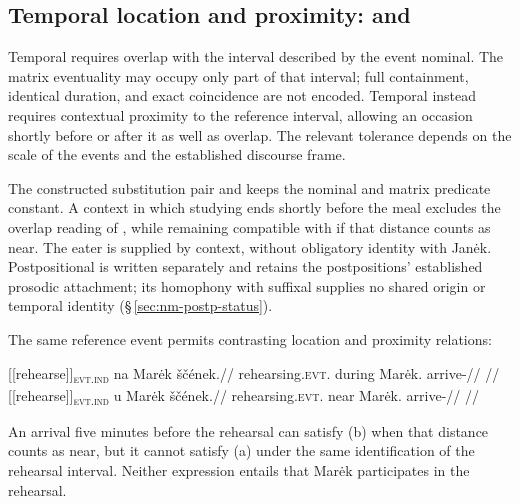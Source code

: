 \subsection{Temporal location and proximity:  and }

Temporal  requires overlap with the interval described by the event
nominal. The matrix eventuality may occupy only part of that interval; full
containment, identical duration, and exact coincidence are not encoded.
Temporal  instead requires contextual proximity to the reference
interval, allowing an occasion shortly before or after it as well as overlap.
The relevant tolerance depends on the scale of the events and the established
discourse frame.

The constructed substitution pair 
 and
 keeps the nominal and
matrix predicate constant. A context in which studying ends shortly before
the meal excludes the overlap reading of , while remaining compatible
with  if that distance counts as near. The eater is supplied by context,
without obligatory identity with Janėk. Postpositional  is written
separately and retains the postpositions' established prosodic attachment;
its homophony with suffixal  supplies no shared origin or temporal
identity (§\,\ref{sec:nm-postp-status}).

The same reference event permits contrasting location and proximity
relations:

\pex\label{ex:slot-location-proximity}
\a
\begingl
\gla \textnormal{[[rehearse]]}\textsubscript{\textsc{evt.ind}} na Marėk ščének.//
\glb rehearsing.\textsc{evt}.\Ind{} during Marėk.\Dir{} arrive-\Pf{}//
\glft {}
//
\endgl
\a
\begingl
\gla \textnormal{[[rehearse]]}\textsubscript{\textsc{evt.ind}} u Marėk ščének.//
\glb rehearsing.\textsc{evt}.\Ind{} near Marėk.\Dir{} arrive-\Pf{}//
\glft {}
//
\endgl
\xe

An arrival five minutes before the rehearsal can satisfy (b) when
that distance counts as near, but it cannot satisfy (a) under the same
identification of the rehearsal interval. Neither expression entails that
Marėk participates in the rehearsal.

